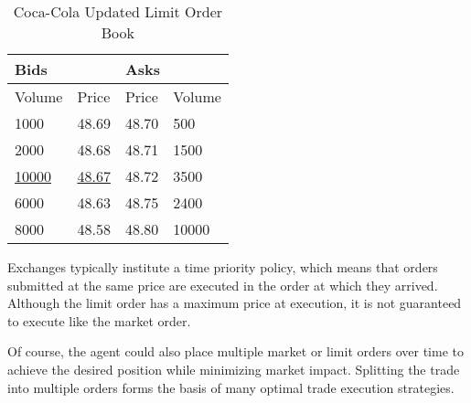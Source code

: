 \begin{table}[htbp]
\caption{Coca-Cola Updated Limit Order Book} \label{tab:coke2}
\begin{center}
\begin{tabular}{ll|ll}
\hline \hline
\multicolumn{2}{l|}{\textbf{Bids}} & \multicolumn{2}{l}{\textbf{Asks}} \\
\hline
Volume           & Price          & Price           & Volume          \\
\hline
1000             & 48.69          & 48.70           & 500             \\
2000             & 48.68          & 48.71           & 1500            \\
\underline{10000}             & \underline{48.67}          & 48.72           & 3500            \\
6000             & 48.63          & 48.75           & 2400            \\
8000             & 48.58          & 48.80           & 10000          
\end{tabular}
\end{center}
\end{table}

Exchanges typically institute a time priority policy, which means that orders submitted at the same price are executed in the order at which they arrived. Although the limit order has a maximum price at execution, it is not guaranteed to execute like the market order. 

Of course, the agent could also place multiple market or limit orders over time to achieve the desired position while minimizing market impact. Splitting the trade into multiple orders forms the basis of many optimal trade execution strategies.

